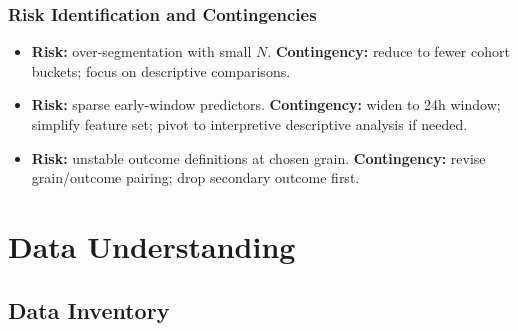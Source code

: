 \documentclass[12pt]{article}
\begin{document}
\subsubsection*{Risk Identification and Contingencies}
\begin{itemize}[leftmargin=1.5em]
    \item \textbf{Risk:} over-segmentation with small $N$. \textbf{Contingency:} reduce to fewer cohort buckets; focus on descriptive comparisons.
    \item \textbf{Risk:} sparse early-window predictors. \textbf{Contingency:} widen to 24h window; simplify feature set; pivot to interpretive descriptive analysis if needed.
    \item \textbf{Risk:} unstable outcome definitions at chosen grain. \textbf{Contingency:} revise grain/outcome pairing; drop secondary outcome first.
\end{itemize}

\newpage

\section{Data Understanding}
\label{sec:data_understanding}

%
%

\subsection{Data Inventory}
\label{subsec:data_inventory}

%
%
\end{document}
